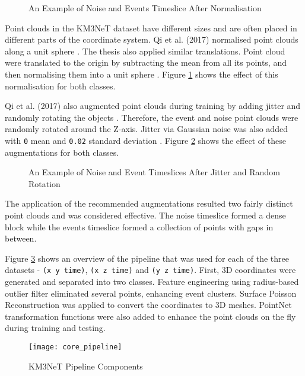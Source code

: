 \begin{figure}[ht!]   
\centering
{}
\caption[]{An Example of Noise and Events Timeslice After Normalisation}
\label{fig:normalised}
\end{figure}

Point clouds in the KM3NeT dataset have different sizes and are often placed in different parts of the coordinate system. Qi et al. (2017) normalised point clouds along a unit sphere \cite{qi2017pointnet}. The thesis also applied similar translations. Point cloud were translated to the origin by subtracting the mean from all its points, and then normalising them into a unit sphere \cite{qi2017pointnet}. Figure \ref{fig:normalised} shows the effect of this normalisation for both classes.

Qi et al. (2017) also augmented point clouds during training by adding jitter and randomly rotating the objects \cite{qi2017pointnet}. Therefore, the event and noise point clouds were randomly rotated around the Z-axis. Jitter via Gaussian noise was also added with \texttt{0} mean and \texttt{0.02} standard deviation \cite{qi2017pointnet}. Figure \ref{fig:augmented} shows the effect of these augmentations for both classes. 

\begin{figure}[ht!]   
\centering
{}
\hspace{0.01cm}
\caption[]{An Example of Noise and Event Timeslices After Jitter and Random Rotation}
\label{fig:augmented}
\end{figure}

The application of the recommended augmentations resulted two fairly distinct point clouds and was considered effective. The noise timeslice formed a dense block while the events timeslice formed a collection of points with gaps in between.

Figure \ref{fig:core_pipeline} shows an overview of the pipeline that was used for each of the three datasets - \texttt{(x y time)}, \texttt{(x z time)} and \texttt{(y z time)}. First, 3D coordinates were generated and separated into two classes. Feature engineering using radius-based outlier filter eliminated several points, enhancing event clusters. Surface Poisson Reconstruction was applied to convert the coordinates to 3D meshes. PointNet transformation functions were also added to enhance the point clouds on the fly during training and testing.

\begin{figure}[ht!]
    \centering
    \texttt{[image: core\_pipeline]}
    \caption{KM3NeT Pipeline Components}
    \label{fig:core_pipeline}
\end{figure}

\let\cleardoublepage\clearpage

